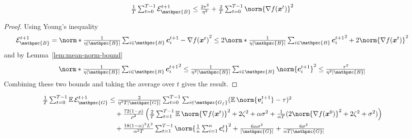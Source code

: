 \documentclass{article}
\newcommand{\gset}{\ensuremath{{\mathpzc{G}}}}
\newcommand{\bset}{\ensuremath{{\mathpzc{B}}}}
\newcommand{\gfset}{\ensuremath{{\mathpzc{G_f}}}}
\begin{document}
\begin{lemma}\label{lem:error-bad-workers}
  \begin{align*}
    \tfrac{1}{T} \tsum_{t=0}^{T-1} \cE_\bset^{t+1} 
     \le 
    \tfrac{2\tau^2}{\eta^2} + \tfrac{2}{T} \tsum_{t=0}^{T-1} \norm{ \nabla f(\xx^t) }^2  
  \end{align*}
\end{lemma}

\begin{proof}
  Using Young's inequality
  \begin{align*}
    \cE_\bset^{t+1} 
     =
    \norm*{\tfrac{1}{\eta |\bset|} \tsum_{i\in\bset} \cc_i^{t+1} - \nabla f(\xx^t)}^2 
     \le 
    2\norm*{\tfrac{1}{\eta |\bset|} \tsum_{i\in\bset} \cc_i^{t+1}}^2 
    + 2 \norm{\nabla f(\xx^t)}^2  
  \end{align*}
  and by Lemma~\ref{lem:mean-norm-bound} 
  \[
    \norm*{\tfrac{1}{\eta |\bset|} \tsum_{i\in\bset} \cc_i^{t+1}}^2 
     \le 
    \tfrac{1}{\eta^2 |\bset|} \tsum_{i\in\bset} \norm{\cc_i^{t+1}}^2 
     \le 
    \tfrac{\tau^2}{\eta^2 |\bset|}
  \]
Combining these two bounds and taking the average over $t$ gives the result.
\end{proof}


\begin{lemma}\label{lem:error-good-workers}
\begin{align*}
  \tfrac{1}{T} \tsum_{t=0}^{T-1} \E \cE_\gset^{t+1} 
   &\le
  \tfrac{2}{\eta^2 T |\gset|} \tsum_{t=0}^{T-1} \tsum_{i\in\gfset} (\E \norm{ \vv_i^{t+1} } - \tau)^2
  \\
   & \quad + 
  \tfrac{72(1-\rho)}{\rho^2} 
    \left(      
      \tfrac{2}{T}\tsum_{t=1}^{T-1} \E \norm{\nabla f(\xx^t) }^2
      +  2  \zeta^2
      + \alpha\sigma^2                                             
      + \tfrac{1}{\alpha T}(2\norm{\nabla f(\xx^0) }^2
      + 2 \zeta^2
      + \sigma^2)
    \right)
  \\
   & \quad +
  \tfrac{18(1-\alpha)^2 L^2}{\alpha^2T} \tsum_{t=1}^{T-1}
  \norm{ \tfrac{1}{n} \tsum_{i=1}^n \cc_i^t }^2
  + \tfrac{6\alpha\sigma^2}{|\gset|} + \tfrac{6\sigma^2}{\alpha T|\gset|}
\end{align*}
\end{lemma}
\end{document}
